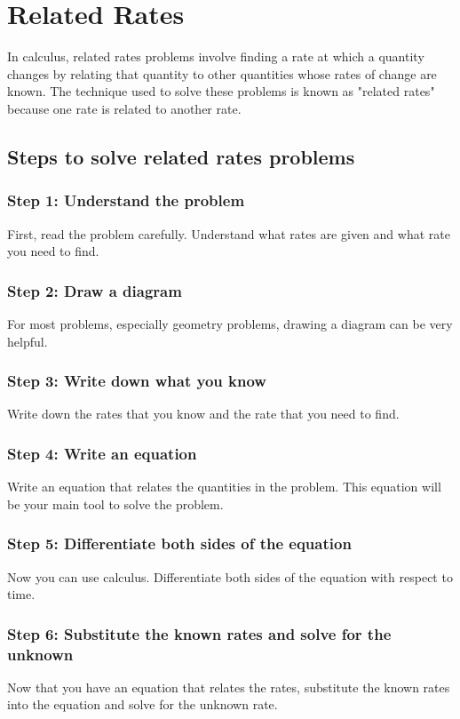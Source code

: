 \chapter{Related Rates}

In calculus, related rates problems involve finding a rate at which a quantity changes by relating that quantity to other quantities whose rates of change are known. The technique used to solve these problems is known as "related rates" because one rate is related to another rate.

\section{Steps to solve related rates problems}

\subsection{Step 1: Understand the problem}
First, read the problem carefully. Understand what rates are given and what rate you need to find.

\subsection{Step 2: Draw a diagram}
For most problems, especially geometry problems, drawing a diagram can be very helpful.

\subsection{Step 3: Write down what you know}
Write down the rates that you know and the rate that you need to find.

\subsection{Step 4: Write an equation}
Write an equation that relates the quantities in the problem. This equation will be your main tool to solve the problem.

\subsection{Step 5: Differentiate both sides of the equation}
Now you can use calculus. Differentiate both sides of the equation with respect to time.

\subsection{Step 6: Substitute the known rates and solve for the unknown}
Now that you have an equation that relates the rates, substitute the known rates into the equation and solve for the unknown rate.

